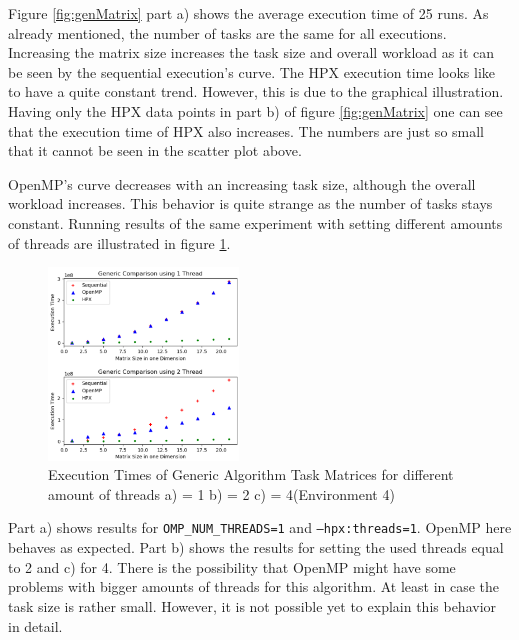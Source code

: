 Figure \ref{fig:genMatrix} part a) shows the average execution time of 25 runs.
As already mentioned, the number of tasks are the same for all executions.
Increasing the matrix size increases the task size and overall workload as it can be seen by the sequential execution's curve.
The HPX execution time looks like to have a quite constant trend.
However, this is due to the graphical illustration.
Having only the HPX data points in part b) of figure \ref{fig:genMatrix} one can see that the execution time of HPX also increases.
The numbers are just so small that it cannot be seen in the scatter plot above.

OpenMP's curve decreases with an increasing task size, although the overall workload increases.
This behavior is quite strange as the number of tasks stays constant.
Running results of the same experiment with setting different amounts of threads are illustrated in figure \ref{fig:genMatrix_Threaded}.

\begin{figure}[h]
	\centering
	\includegraphics[width=0.45\textwidth]{figures/genericMatrix_Threaded.png}
	\caption{Execution Times of Generic Algorithm Task Matrices for different amount of threads a) = 1 b) = 2 c) = 4(Environment 4)}
	\label{fig:genMatrix_Threaded}
\end{figure}

Part a) shows results for \texttt{OMP\_NUM\_THREADS=1} and \texttt{--hpx:threads=1}.
OpenMP here behaves as expected.
Part b) shows the results for setting the used threads equal to 2 and c) for 4.
There is the possibility that OpenMP might have some problems with bigger amounts of threads for this algorithm.
At least in case the task size is rather small.
However, it is not possible yet to explain this behavior in detail.

